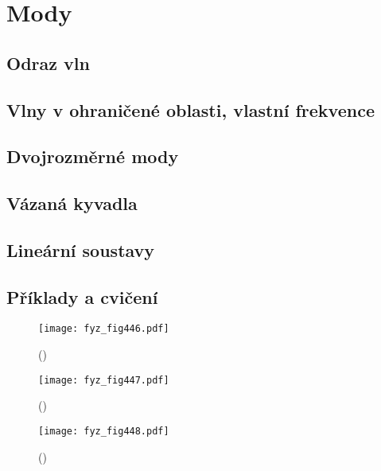 \chapter{Mody}\label{fyz:IchapIL}
\minitoc
  \section{Odraz vln}\label{fyz:IchapILsecI}
  \section{Vlny v ohraničené oblasti, vlastní frekvence}\label{fyz:IchapILsecII}
  \section{Dvojrozměrné mody}\label{fyz:IchapILsecIII}
  \section{Vázaná kyvadla}\label{fyz:IchapILsecIV}
  \section{Lineární soustavy}\label{fyz:IchapILsecV}
  \section{Příklady a cvičení}\label{fyz:IchapILsecVI}

    \begin{figure}[ht!] %
      \centering
      \texttt{[image: fyz\_fig446.pdf]}
      \caption{ 
               (\cite[s.~707]{Feynman01})}
      \label{fyz_fig446}
    \end{figure}

    \begin{figure}[ht!] %
      \centering
      \texttt{[image: fyz\_fig447.pdf]}
      \caption{ 
               (\cite[s.~707]{Feynman01})}
      \label{fyz_fig447}
    \end{figure}

    \begin{figure}[ht!] %
      \centering
      \texttt{[image: fyz\_fig448.pdf]}
      \caption{ 
               (\cite[s.~707]{Feynman01})}
      \label{fyz_fig448}
    \end{figure}

